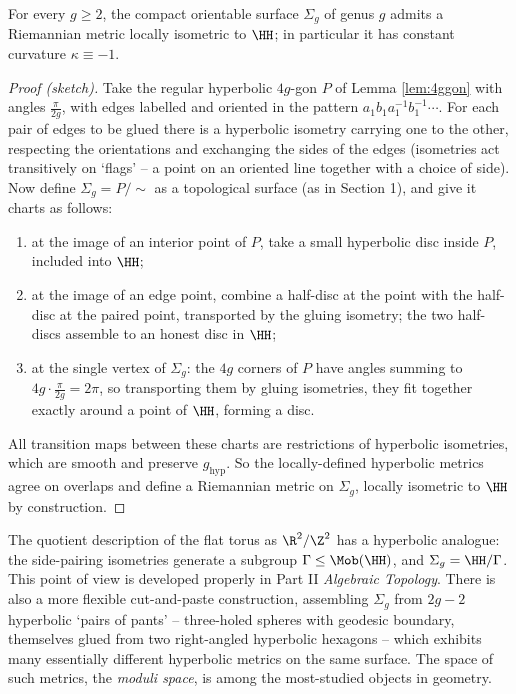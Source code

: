 \begin{theorem}
    For every $g \geq 2$, the compact orientable surface $\Sigma_g$ of genus $g$ admits a Riemannian metric locally isometric to $\HH$; in particular it has constant curvature $\kappa \equiv -1$.
\end{theorem}
\begin{proof}[Proof (sketch)]
    Take the regular hyperbolic $4g$-gon $P$ of Lemma \ref{lem:4ggon} with angles $\frac{\pi}{2g}$, with edges labelled and oriented in the pattern $a_1 b_1 a_1^{-1}b_1^{-1}\cdots$. For each pair of edges to be glued there is a hyperbolic isometry carrying one to the other, respecting the orientations and exchanging the sides of the edges (isometries act transitively on `flags' -- a point on an oriented line together with a choice of side). Now define $\Sigma_g = P/\sim$ as a topological surface (as in Section 1), and give it charts as follows:
    \begin{enumerate}[label=(\roman*)]
        \item at the image of an interior point of $P$, take a small hyperbolic disc inside $P$, included into $\HH$;
        \item at the image of an edge point, combine a half-disc at the point with the half-disc at the paired point, transported by the gluing isometry; the two half-discs assemble to an honest disc in $\HH$;
        \item at the single vertex of $\Sigma_g$: the $4g$ corners of $P$ have angles summing to $4g \cdot \frac{\pi}{2g} = 2\pi$, so transporting them by gluing isometries, they fit together exactly around a point of $\HH$, forming a disc.
    \end{enumerate}
    All transition maps between these charts are restrictions of hyperbolic isometries, which are smooth and preserve $g_{\mathrm{hyp}}$. So the locally-defined hyperbolic metrics agree on overlaps and define a Riemannian metric on $\Sigma_g$, locally isometric to $\HH$ by construction.
\end{proof}

\begin{remark}
    The quotient description of the flat torus as $\R^2/\Z^2$ has a hyperbolic analogue: the side-pairing isometries generate a subgroup $\Gamma \leq \Mob(\HH)$, and $\Sigma_g = \HH/\Gamma$. This point of view is developed properly in Part II \emph{Algebraic Topology}. There is also a more flexible cut-and-paste construction, assembling $\Sigma_g$ from $2g - 2$ hyperbolic `pairs of pants' -- three-holed spheres with geodesic boundary, themselves glued from two right-angled hyperbolic hexagons -- which exhibits many essentially different hyperbolic metrics on the same surface. The space of such metrics, the \emph{moduli space}, is among the most-studied objects in geometry.
\end{remark}

